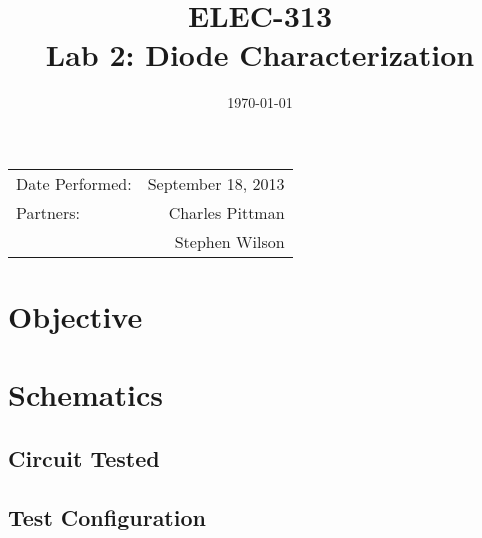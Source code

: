 \documentclass{article}
\author{}
\title{ELEC-313 \\ Lab 2: Diode Characterization \\ }
\date{\today}
\begin{document}
\maketitle

\begin{center}
  \begin{tabular}{lr}
    Date Performed: & September 18, 2013 \\
    Partners: & Charles Pittman \\
    & Stephen Wilson \\
  \end{tabular}
\end{center}

\pagebreak


\renewcommand{\labelenumi}{\alph{enumi}.}

\section{Objective}
\label{sec:objective}


\section{Schematics}
\label{sec:schematics}

\subsection*{Circuit Tested}
\label{sec:ckt_tested}


\subsection*{Test Configuration}
\label{sec:test_config}

\end{document}
